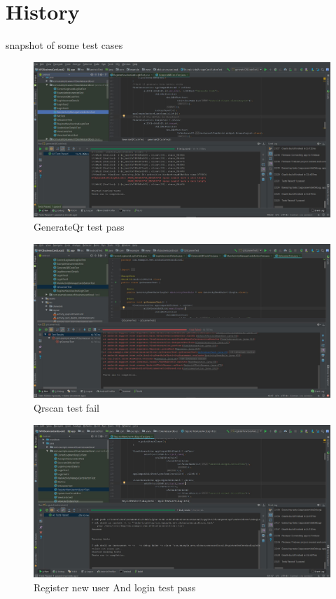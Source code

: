\documentclass[english]{article}
\begin{document}
	\section{History}
	snapshot of some test cases
\begin{figure}[h!]
				\centering
			\includegraphics[scale=0.7]{Capture.jpg}
				\caption{GenerateQr test pass}
				\label{figure: 1}
			\end{figure}
\begin{figure}
				\centering
			\includegraphics[scale=0.7]{QrscanFail.jpg}
				\caption{Qrscan test fail}
				\label{figure: 1}
			\end{figure}
\begin{figure}
				\centering
			\includegraphics[scale=0.7]{RegisterTest.jpg}
				\caption{Register new user And login test pass}
				\label{figure: 1}
			\end{figure}


	
	
		
\end{document}
